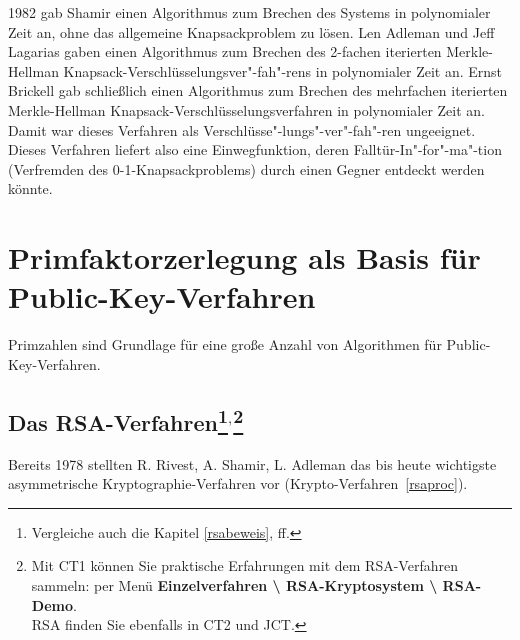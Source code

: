 \begin{refsegment}
1982 gab  Shamir \cite{Shamir1982} einen Algorithmus zum
Brechen des Systems in polynomialer  Zeit an, ohne das allgemeine
Knapsackproblem zu lösen. Len  Adleman
\cite{Adleman1982} und Jeff Lagarias 
\cite{Lagarias1983} gaben einen Algorithmus zum Brechen des 2-fachen
iterierten Merkle-Hellman Knapsack-Verschlüsselungsver"-fah"-rens in
polynomialer Zeit an. Ernst Brickell 
\cite{Brickell1985} gab schließlich einen Algorithmus zum Brechen des
mehrfachen iterierten Merkle-Hellman Knapsack-Ver\-schlüsse\-lungs\-ver\-fah\-ren in
polynomialer Zeit an. Damit war dieses Verfahren als
Verschlüsse"-lungs"-ver"-fah"-ren ungeeignet. Dieses Verfahren liefert also eine
Einwegfunktion, deren Falltür-In"-for"-ma"-tion (Verfremden des
0-1-Knapsackproblems) durch einen Gegner entdeckt werden könnte.



\clearpage
\section{Primfaktorzerlegung als Basis für Public-Key-Verfahren}

Primzahlen sind Grundlage für eine große Anzahl von Algorithmen für Public-Key-Verfahren.


\hypertarget{RSAVerfahren}{}
\subsection[Das RSA-Verfahren]{Das RSA-Verfahren\footnote{%
  Vergleiche auch die Kapitel \ref{rsabeweis}, ff.
}$^,$\footnote{%
Mit CT1 können Sie praktische Erfahrungen
mit dem RSA-Verfahren sammeln: per Menü \textbf{Einzelverfahren
\textbackslash{} RSA-Kryptosystem \textbackslash{} RSA-Demo}.\\
RSA finden Sie ebenfalls in CT2 und JCT.
}
}
 \label{rsaverfahren}

Bereits 1978 stellten R.  Rivest,
 A. Shamir,   L. Adleman
\cite{rivest/shamir/adleman:1978} das bis heute wichtigste
asymmetrische Kryptographie-Verfahren vor (Krypto-Verfahren~\ref{rsaproc}).



\end{refsegment}
